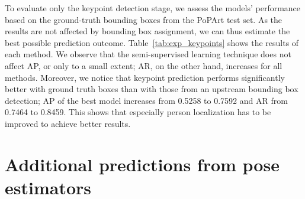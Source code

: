 \documentclass[sigconf]{acmart}
\begin{document}
\noindent To evaluate only the keypoint detection stage, we assess the models' performance based on the ground-truth bounding boxes from the \ac{PoPArt} test set. As the results are not affected by bounding box assignment, we can thus estimate the best possible prediction outcome. Table~\ref{tab:exp_keypoints} shows the results of each method. We observe that the semi-supervised learning technique does not affect \ac{AP}, or only to a small extent; \ac{AR}, on the other hand, increases for all methods. Moreover, we notice that keypoint prediction performs significantly better with ground truth boxes than with those from an upstream bounding box detection; \ac{AP} of the best model increases from \num{0.5258} to \num{0.7592} and \ac{AR} from \num{0.7464} to \num{0.8459}. This shows that especially person localization has to be improved to achieve better results.  
\vspace{12pt}


\section{Additional predictions from pose estimators}
\end{document}
